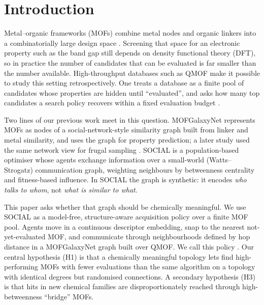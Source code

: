 \section{Introduction}
\label{sec:intro}

Metal--organic frameworks (MOFs) combine metal nodes and organic linkers into a combinatorially large design space \citep{furukawa2013mof}. Screening that space for an electronic property such as the band gap still depends on density functional theory (DFT), so in practice the number of candidates that can be evaluated is far smaller than the number available. High-throughput databases such as QMOF \citep{rosen2021qmof,rosen2022qmof} make it possible to study this setting retrospectively. One treats a database as a finite pool of candidates whose properties are hidden until ``evaluated'', and asks how many top candidates a search policy recovers within a fixed evaluation budget \citep{lookman2019active,moosavi2020ml}.

Two lines of our previous work meet in this question. MOFGalaxyNet \citep{jalali2023mofgalaxynet} represents MOFs as nodes of a social-network-style similarity graph built from linker and metal similarity, and uses the graph for property prediction; a later study used the same network view for frugal sampling \citep{jalali2025blackhole}. SOCIAL \citep{jalali2026social} is a population-based optimiser whose agents exchange information over a small-world (Watts--Strogatz) communication graph, weighting neighbours by betweenness centrality and fitness-based influence. In SOCIAL the graph is synthetic: it encodes \emph{who talks to whom}, not \emph{what is similar to what}.

This paper asks whether that graph should be chemically meaningful. We use SOCIAL as a model-free, structure-aware acquisition policy over a finite MOF pool. Agents move in a continuous descriptor embedding, snap to the nearest not-yet-evaluated MOF, and communicate through neighbourhoods defined by hop distance in a MOFGalaxyNet graph built over QMOF. We call this policy \gs{}. Our central hypothesis (H1) is that a chemically meaningful topology lets \gs{} find high-performing MOFs with fewer evaluations than the same algorithm on a topology with identical degrees but randomised connections. A secondary hypothesis (H3) is that hits in new chemical families are disproportionately reached through high-betweenness ``bridge'' MOFs.

